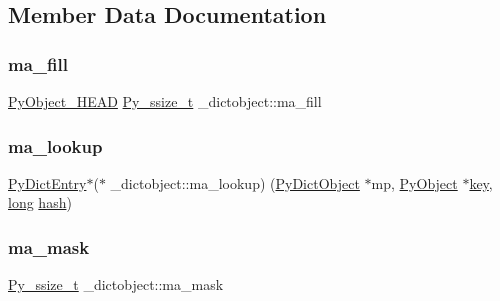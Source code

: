 \subsection{Member Data Documentation}
\mbox{\label{struct__dictobject_a35c4ddb1dbbe09350d08e3c861a8ef5d}} 
\subsubsection{\texorpdfstring{ma\_fill}{ma\_fill}}
{\footnotesize\ttfamily \mbox{\hyperlink{_python27_2object_8h_a0bf35c1f3ea13f925de94d8593db3b7e}{Py\+Object\+\_\+\+H\+E\+AD}} \mbox{\hyperlink{pyport_8h_ac6411a3dfda9ac6feb9e8d859b1184bc}{Py\+\_\+ssize\+\_\+t}} \+\_\+dictobject\+::ma\+\_\+fill}

\mbox{\label{struct__dictobject_af09459ee2b142a27ccd41b0dafab43a9}} 
\subsubsection{\texorpdfstring{ma\_lookup}{ma\_lookup}}
{\footnotesize\ttfamily \mbox{\hyperlink{struct_py_dict_entry}{Py\+Dict\+Entry}}$\ast$($\ast$ \+\_\+dictobject\+::ma\+\_\+lookup) (\mbox{\hyperlink{dictobject_8h_aeac76c4875acec7df78dd5be7097eb61}{Py\+Dict\+Object}} $\ast$mp, \mbox{\hyperlink{_python27_2object_8h_aadc84ac7aed2cfa6f20c25f62bf3dac7}{Py\+Object}} $\ast$\mbox{\hyperlink{setobject_8h_ab06f52e01abcbec81a27c56570d3c10b}{key}}, \mbox{\hyperlink{modsupport_8h_a0cb68e00fb9fb1260ee2daadd9fe6611}{long}} \mbox{\hyperlink{group__python__builtins_ga117a7eab72791313448c40a2f25f3582}{hash}})}

\mbox{\label{struct__dictobject_a043ec319e6e9ee42aa441ac5028123b1}} 
\subsubsection{\texorpdfstring{ma\_mask}{ma\_mask}}
{\footnotesize\ttfamily \mbox{\hyperlink{pyport_8h_ac6411a3dfda9ac6feb9e8d859b1184bc}{Py\+\_\+ssize\+\_\+t}} \+\_\+dictobject\+::ma\+\_\+mask}

